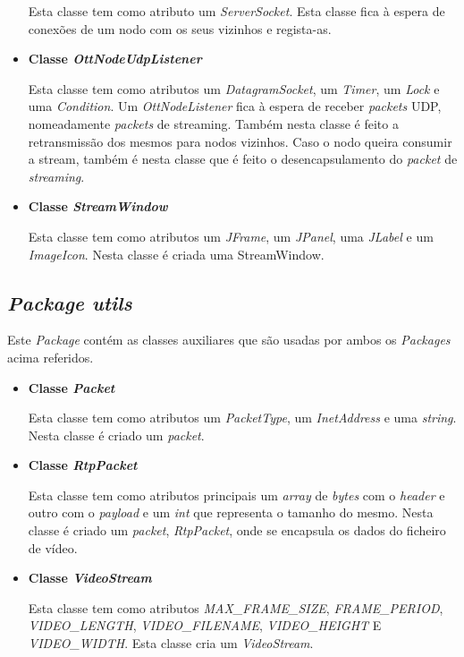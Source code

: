 \documentclass[a4paper, 11pt]{article}
\begin{document}
\begin{itemize}
    Esta classe tem como atributo um \textit{ServerSocket}. Esta classe fica à espera de conexões de um nodo com os seus vizinhos e regista-as. 
    
    \item \textbf{Classe \textit{OttNodeUdpListener}}
    
    Esta classe tem como atributos um \textit{DatagramSocket}, um \textit{Timer}, um \textit{Lock} e uma \textit{Condition}. Um \textit{OttNodeListener} fica à espera de receber \textit{packets} UDP, nomeadamente \textit{packets} de streaming. Também nesta classe é feito a retransmissão dos mesmos para nodos vizinhos. Caso o nodo queira consumir a stream, também é nesta classe que é feito o desencapsulamento do \textit{packet} de \textit{streaming}. 
    
    \item \textbf{Classe \textit{StreamWindow}}
    
    Esta classe tem como atributos um \textit{JFrame}, um \textit{JPanel}, uma \textit{JLabel} e um \textit{ImageIcon}. Nesta classe é criada uma StreamWindow.
    
\end{itemize}

\subsection{\textit{Package utils}}

Este \textit{Package} contém as classes auxiliares que são usadas por ambos os \textit{Packages} acima referidos.

\begin{itemize}

    \item \textbf{Classe \textit{Packet}}
    
    Esta classe tem como atributos um \textit{PacketType}, um \textit{InetAddress} e uma \textit{string}. Nesta classe é criado um \textit{packet}.
    
    \item \textbf{Classe \textit{RtpPacket}}
    
    Esta classe tem como atributos principais um \textit{array} de \textit{bytes} com o \textit{header} e outro com o \textit{payload} e um \textit{int} que representa o tamanho do mesmo. Nesta classe é criado um \textit{packet}, \textit{RtpPacket}, onde se encapsula os dados do ficheiro de vídeo.

    \item \textbf{Classe \textit{VideoStream}}
    
    Esta classe tem como atributos \textit{MAX\_FRAME\_SIZE}, \textit{FRAME\_PERIOD}, \textit{VIDEO\_LENGTH}, \textit{VIDEO\_FILENAME}, \textit{VIDEO\_HEIGHT} E \textit{VIDEO\_WIDTH}. Esta classe cria um \textit{VideoStream}.

\end{itemize}
\end{document}
